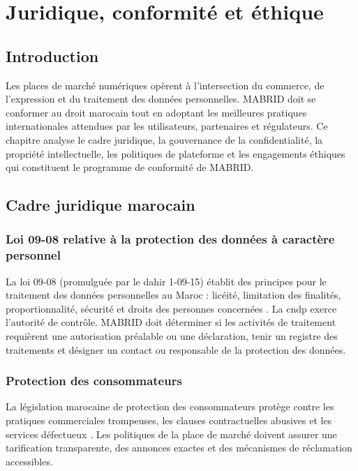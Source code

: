 \chapter{Juridique, conformité et éthique}
\label{ch:legal}

\section{Introduction}

Les places de marché numériques opèrent à l'intersection du commerce, de l'expression et du traitement des données personnelles. MABRID doit se conformer au droit marocain tout en adoptant les meilleures pratiques internationales attendues par les utilisateurs, partenaires et régulateurs. Ce chapitre analyse le cadre juridique, la gouvernance de la confidentialité, la propriété intellectuelle, les politiques de plateforme et les engagements éthiques qui constituent le programme de conformité de MABRID.

\section{Cadre juridique marocain}

\subsection{Loi 09-08 relative à la protection des données à caractère personnel}

La loi 09-08 (promulguée par le dahir 1-09-15) établit des principes pour le traitement des données personnelles au Maroc : licéité, limitation des finalités, proportionnalité, sécurité et droits des personnes concernées \parencite{moroccoLaw0908}. La \gls{cndp} exerce l'autorité de contrôle. MABRID doit déterminer si les activités de traitement requièrent une autorisation préalable ou une déclaration, tenir un registre des traitements et désigner un contact ou responsable de la protection des données.

\subsection{Protection des consommateurs}

La législation marocaine de protection des consommateurs protège contre les pratiques commerciales trompeuses, les clauses contractuelles abusives et les services défectueux \parencite{moroccoConsumer}. Les politiques de la place de marché doivent assurer une tarification transparente, des annonces exactes et des mécanismes de réclamation accessibles.

